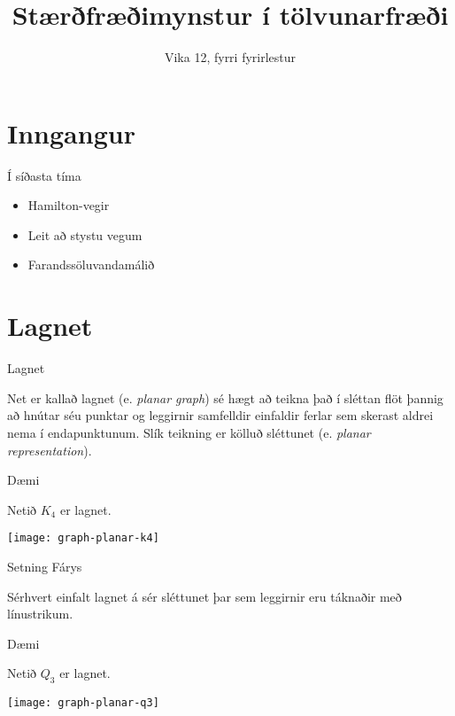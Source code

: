 \documentclass[handout]{beamer}
\title{Stærðfræðimynstur í tölvunarfræði}
\subtitle{Vika 12, fyrri fyrirlestur}
\begin{document}
\begin{frame}
\titlepage
\end{frame}


\section{Inngangur}

\begin{frame}{Í síðasta tíma}
\begin{itemize}
 \item Hamilton-vegir
 \item Leit að stystu vegum
 \item Farandssöluvandamálið
\end{itemize}
\end{frame}

\section{Lagnet}

\begin{frame}{Lagnet}
\begin{tcolorbox}[title=Lagnet]
Net er kallað lagnet (e. \emph{planar graph}) sé hægt að teikna það í sléttan flöt þannig að hnútar séu punktar og leggirnir samfelldir einfaldir ferlar sem skerast aldrei nema í endapunktunum. Slík teikning er kölluð sléttunet (e. \emph{planar representation}).
\end{tcolorbox}
\end{frame}

\begin{frame}{Dæmi}
\begin{center}
Netið $K_4$ er lagnet. \pause

\texttt{[image: graph-planar-k4]}
\end{center}
\end{frame}

\begin{frame}{Setning Fárys}
    \begin{tcolorbox}[title=Setning Fárys]
        Sérhvert einfalt lagnet á sér sléttunet þar sem leggirnir eru táknaðir með línustrikum.
    \end{tcolorbox}
\end{frame}

\begin{frame}{Dæmi}
\begin{center}
Netið $Q_3$ er lagnet.

\texttt{[image: graph-planar-q3]}
\end{center}
\end{frame}
\end{document}
